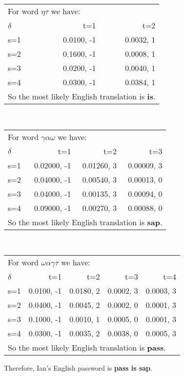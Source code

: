 \documentclass[letterpaper,11pt]{article}
\begin{document}
\begin{tabular}{l | r r}
  \multicolumn{3}{l}{For word $\eta \tau $ we have:}\\
  $\delta$ & t=1 & t=2 \\
  \hline
  s=1 & 0.0100, -1 & 0.0032, 1 \\
  s=2 & 0.1600, -1 & 0.0008, 1 \\
  s=3 & 0.0200, -1 & 0.0040, 1 \\
  s=4 & 0.0300, -1 & 0.0384, 1 \\
  \multicolumn{3}{l}{So the most likely English translation is \textbf{is}.}\\
\end{tabular}\\
\newline
\newline
\begin{tabular}{l | r r r}
  \multicolumn{4}{l}{For word $\gamma \alpha \omega$ we have:}\\
  $\delta$ & t=1 & t=2 & t=3 \\
  \hline
  s=1 & 0.02000, -1 & 0.01260, 3 & 0.00009, 3 \\
  s=2 & 0.04000, -1 & 0.00540, 3 & 0.00013, 0 \\
  s=3 & 0.04000, -1 & 0.00135, 3 & 0.00094, 0 \\
  s=4 & 0.09000, -1 & 0.00270, 3 & 0.00088, 0 \\
  \hline
  \multicolumn{4}{l}{So the most likely English translation is \textbf{sap}.}\\
\end{tabular}\\
\newline
\newline
\begin{tabular}{l | r r r r}
  \multicolumn{5}{l}{For word $\omega \alpha \gamma \tau$ we have:}\\
  $\delta$ & t=1 & t=2 & t=3 & t=4 \\
  \hline
  s=1 & 0.0100, -1 & 0.0180, 2 & 0.0002, 3 & 0.0003, 3 \\
  s=2 & 0.0400, -1 & 0.0045, 2 & 0.0002, 0 & 0.0001, 3 \\
  s=3 & 0.1000, -1 & 0.0010, 1 & 0.0005, 0 & 0.0001, 3 \\
  s=4 & 0.0300, -1 & 0.0035, 2 & 0.0038, 0 & 0.0005, 3 \\
  \multicolumn{5}{l}{So the most likely English translation is \textbf{pass}.}\\
\end{tabular}
\newline
Therefore, Ian's English password is \textbf{pass is sap}.
\end{document}
